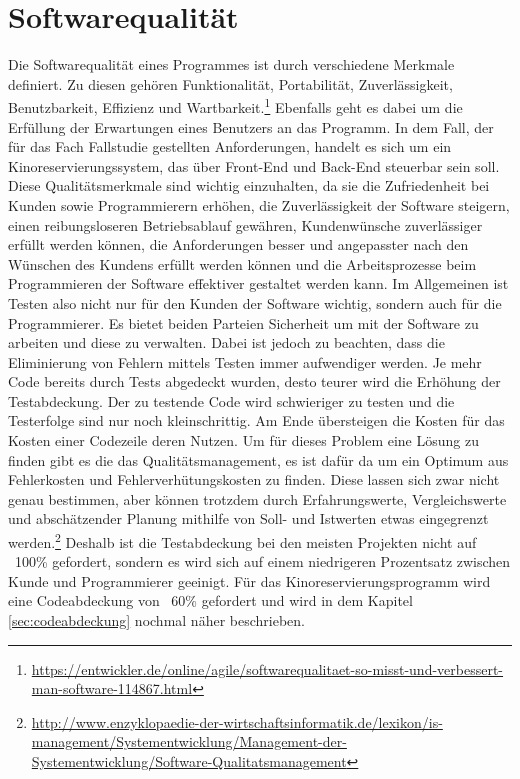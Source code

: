 \section{Softwarequalität}
\authorsection{\authorEJ}

Die Softwarequalität eines Programmes ist durch verschiedene Merkmale definiert. Zu diesen gehören Funktionalität, Portabilität, Zuverlässigkeit, Benutzbarkeit, Effizienz und Wartbarkeit.\footnote{\url{https://entwickler.de/online/agile/softwarequalitaet-so-misst-und-verbessert-man-software-114867.html}}
Ebenfalls geht es dabei um die Erfüllung der Erwartungen eines Benutzers an das Programm. In dem Fall, der für das Fach Fallstudie gestellten Anforderungen, handelt es sich um ein Kinoreservierungssystem, das über Front-End und Back-End steuerbar sein soll.
Diese Qualitätsmerkmale sind wichtig einzuhalten, da sie die Zufriedenheit bei Kunden sowie Programmierern erhöhen, die Zuverlässigkeit der Software steigern, einen reibungsloseren Betriebsablauf gewähren, Kundenwünsche zuverlässiger erfüllt werden können, die Anforderungen besser und angepasster nach den Wünschen des Kundens erfüllt werden können und die Arbeitsprozesse beim Programmieren der Software effektiver gestaltet werden kann.
Im Allgemeinen ist Testen also nicht nur für den Kunden der Software wichtig, sondern auch für die Programmierer. 
Es bietet beiden Parteien Sicherheit um mit der Software zu arbeiten und diese zu verwalten. 
Dabei ist jedoch zu beachten, dass die Eliminierung von Fehlern mittels Testen immer aufwendiger werden.
Je mehr Code bereits durch Tests abgedeckt wurden, desto teurer wird die Erhöhung der Testabdeckung. Der zu testende Code wird schwieriger zu testen und die Testerfolge sind nur noch kleinschrittig. Am Ende übersteigen die Kosten für das Kosten einer Codezeile deren Nutzen. Um für dieses Problem eine Lösung zu finden gibt es die das Qualitätsmanagement, es ist dafür da um ein Optimum aus Fehlerkosten und Fehlerverhütungskosten zu finden. Diese lassen sich zwar nicht genau bestimmen, aber können trotzdem durch Erfahrungswerte, Vergleichswerte und abschätzender Planung mithilfe von Soll- und Istwerten etwas eingegrenzt werden.\footnote{\url{http://www.enzyklopaedie-der-wirtschaftsinformatik.de/lexikon/is-management/Systementwicklung/Management-der-Systementwicklung/Software-Qualitatsmanagement}} Deshalb ist die Testabdeckung bei den meisten Projekten nicht auf ~100\% gefordert, sondern es wird sich auf einem niedrigeren Prozentsatz zwischen Kunde und Programmierer geeinigt. Für das Kinoreservierungsprogramm wird eine Codeabdeckung von ~60\% gefordert und wird in dem Kapitel \vref{sec:codeabdeckung} nochmal näher beschrieben.

